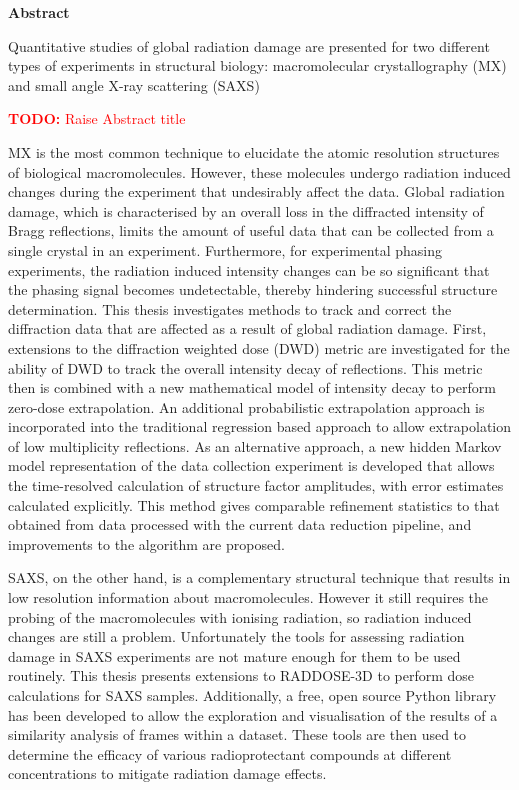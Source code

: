 \newenvironment{abstract}%
{\cleardoublepage\thispagestyle{empty}\null\vfill\begin{center}%
\bfseries Abstract\end{center}}%
{\vfill\null}
\begin{abstract}
\small
\singlespacing
Quantitative studies of global radiation damage are presented for two different types of experiments in structural biology: macromolecular crystallography (MX) and small angle X-ray scattering (SAXS)
\textcolor{red}{
    \begin{myenumerate}
        \item \hypertarget{todo:RaiseAbstract}{\textbf{TODO:} Raise Abstract title}
    \end{myenumerate}
}
MX is the most common technique to elucidate the atomic resolution structures of biological macromolecules.
However, these molecules undergo radiation induced changes during the experiment that undesirably affect the data.
Global radiation damage, which is characterised by an overall loss in the diffracted intensity of Bragg reflections, limits the amount of useful data that can be collected from a single crystal in an experiment.
Furthermore, for experimental phasing experiments, the radiation induced intensity changes can be so significant that the phasing signal becomes undetectable, thereby hindering successful structure determination.
This thesis investigates methods to track and correct the diffraction data that are affected as a result of global radiation damage.
First, extensions to the diffraction weighted dose (DWD) metric are investigated for the ability of DWD to track the overall intensity decay of reflections.
This metric then is combined with a new mathematical model of intensity decay to perform zero-dose extrapolation.
An additional probabilistic extrapolation approach is incorporated into the traditional regression based approach to allow extrapolation of low multiplicity reflections.
As an alternative approach, a new hidden Markov model representation of the data collection experiment is developed that allows the time-resolved calculation of structure factor amplitudes, with error estimates calculated explicitly.
This method gives comparable refinement statistics to that obtained from data processed with the current data reduction pipeline, and improvements to the algorithm are proposed.

SAXS, on the other hand, is a complementary structural technique that results in low resolution information about macromolecules.
However it still requires the probing of the macromolecules with ionising radiation, so radiation induced changes are still a problem.
Unfortunately the tools for assessing radiation damage in SAXS experiments are not mature enough for them to be used routinely.
This thesis presents extensions to RADDOSE-3D to perform dose calculations for SAXS samples.
Additionally, a free, open source Python library has been developed to allow the exploration and visualisation of the results of a similarity analysis of frames within a dataset.
These tools are then used to determine the efficacy of various radioprotectant compounds at different concentrations to mitigate radiation damage effects.
\end{abstract}

